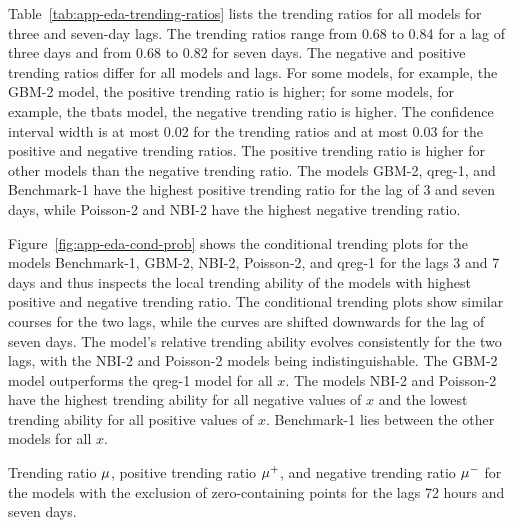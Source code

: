 Table~\ref{tab:app-eda-trending-ratios} lists the trending ratios for all models for three and seven-day lags.
The trending ratios range from 0.68 to 0.84 for a lag of three days and from 0.68 to 0.82 for seven days.
The negative and positive trending ratios differ for all models and lags.
For some models, for example, the GBM-2 model, the positive trending ratio is higher; for some models, for example, the tbats model, the negative trending ratio is higher.
The confidence interval width is at most 0.02 for the trending ratios and at most 0.03 for the positive and negative trending ratios.
The positive trending ratio is higher for other models than the negative trending ratio.
The models GBM-2, qreg-1, and Benchmark-1 have the highest positive trending ratio for the lag of 3 and seven days, while Poisson-2 and NBI-2 have the highest negative trending ratio.

Figure~\ref{fig:app-eda-cond-prob} shows the conditional trending plots for the models Benchmark-1, GBM-2, NBI-2, Poisson-2, and qreg-1 for the lags 3 and 7 days and thus inspects the local trending ability of the models with highest positive and negative trending ratio.
The conditional trending plots show similar courses for the two lags, while the curves are shifted downwards for the lag of seven days.
The model's relative trending ability evolves consistently for the two lags, with the NBI-2 and Poisson-2 models being indistinguishable.
The GBM-2 model outperforms the qreg-1 model for all $x$.
The models NBI-2 and Poisson-2 have the highest trending ability for all negative values of $x$ and the lowest trending ability for all positive values of $x$.
Benchmark-1 lies between the other models for all $x$.

\begin{table}
    \centering
    
    \caption{Trending ratio $\mu$, positive trending ratio $\mu^+$, and negative trending ratio $\mu^-$ for the models with the exclusion of zero-containing points for the lags 72 hours and seven days.}
    \label{tab:app-eda-trending-ratios}
\end{table}

